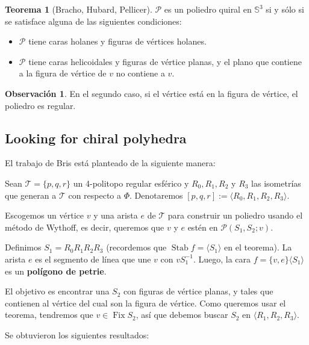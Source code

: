 \documentclass[spanish]{article}
\theoremstyle{definition}
\newtheorem*{obs}{Observación}
\newtheorem*{teo}{Teorema}
\newcommand{\s}{\mathbb{S}}
\newcommand{\p}{\mathcal{P}}
\newcommand{\T}{\mathcal{T}}
\DeclareMathOperator{\Fix}{Fix}
\DeclareMathOperator{\Stab}{Stab}
\begin{document}
\begin{teo}[Bracho, Hubard, Pellicer]
	$\p$ es un poliedro quiral en $\s^3$ si y sólo si se satisface alguna de las siguientes condiciones:
	\begin{itemize}
		\item $\p$ tiene caras holanes y figuras de vértices holanes.
		\item $\p$ tiene caras helicoidales y figuras de vértice planas, y el plano que contiene a la figura de vértice de $v$ no contiene a $v$.
	\end{itemize}
\end{teo}
\begin{obs}
	En el segundo caso, si el vértice está en la figura de vértice, el poliedro es regular.
\end{obs}

\subsection{Looking for chiral polyhedra}
El trabajo de Bris está planteado de la siguiente manera:

Sean $\T=\{p,q,r\}$ un 4-politopo regular esférico y $R_0,R_1,R_2$ y $R_3$ las isometrías que generan a $\T$ con respecto a $\Phi$. Denotaremos $[p,q,r]:=\langle R_0,R_1,R_2,R_3\rangle$.

Escogemos un vértice $v$ y una arista $e$ de $\T$ para construir un poliedro usando el método de Wythoff, es decir, queremos que $v$ y $e$ estén en $\p(S_1,S_2;v)$.

Definimos $S_1=R_0R_1R_2R_3$ (recordemos que $\Stab f=\langle S_1\rangle$ en el teorema).  La arista $e$ es el segmento de línea que une $v$ con $vS_1^{-1}$. Luego, la cara $f=\{v,e\}\langle S_1\rangle$ es un \textbf{polígono de petrie}.

El objetivo es encontrar una $S_2$ con figuras de vértice planas, y tales que contienen al vértice del cual son la figura de vértice. Como queremos usar el teorema, tendremos que $v\in\Fix S_2$, así que debemos buscar $S_2$ en $\langle R_1,R_2,R_3\rangle$.

Se obtuvieron los siguientes resultados:
\end{document}

